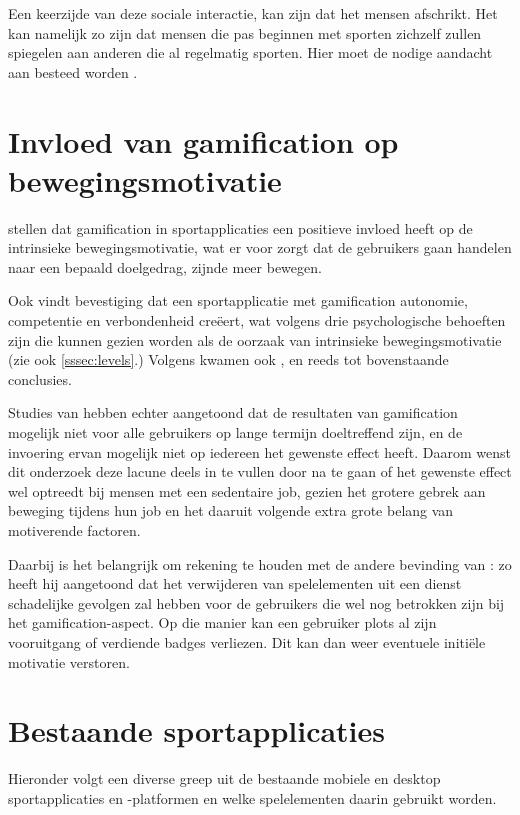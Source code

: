 Een keerzijde van deze sociale interactie, kan zijn dat het mensen afschrikt. Het kan namelijk zo zijn dat mensen die pas beginnen met sporten zichzelf zullen spiegelen aan anderen die al regelmatig sporten. Hier moet de nodige aandacht aan besteed worden \autocite{Jong2010}.

\section{Invloed van gamification op bewegingsmotivatie}

\textcite{Kari2016} stellen dat gamification in sportapplicaties een positieve invloed heeft op de intrinsieke bewegingsmotivatie, wat er voor zorgt dat de gebruikers gaan handelen naar een bepaald doelgedrag, zijnde meer bewegen.

Ook \textcite{Bitrian2020} vindt bevestiging dat een sportapplicatie met gamification autonomie, competentie en verbondenheid creëert, wat volgens \textcite{ManzanoLeon2021} drie psychologische behoeften zijn die kunnen gezien worden als de oorzaak van intrinsieke bewegingsmotivatie (zie ook \ref{sssec:levels}.) Volgens \textcite{Tu2019} kwamen ook \textcite{Lewis2016}, \textcite{Liu2017} en \textcite{Tabak2015} reeds tot bovenstaande conclusies.

Studies van \textcite{Hamari2013a} hebben echter aangetoond dat de resultaten van gamification mogelijk niet voor alle gebruikers op lange termijn doeltreffend zijn, en de invoering ervan mogelijk niet op iedereen het gewenste effect heeft. Daarom wenst dit onderzoek deze lacune deels in te vullen door na te gaan of het gewenste effect wel optreedt bij mensen met een sedentaire job, gezien het grotere gebrek aan beweging tijdens hun job en het daaruit volgende extra grote belang van motiverende factoren.

Daarbij is het belangrijk om rekening te houden met de andere bevinding van \textcite{Hamari2013a}: zo heeft hij aangetoond dat het verwijderen van spelelementen uit een dienst schadelijke gevolgen zal hebben voor de gebruikers die wel nog betrokken zijn bij het gamification-aspect. Op die manier kan een gebruiker plots al zijn vooruitgang of verdiende badges verliezen. Dit kan dan weer eventuele initiële motivatie verstoren.

\section{Bestaande sportapplicaties}
Hieronder volgt een diverse greep uit de bestaande mobiele en desktop sportapplicaties en -platformen en welke spelelementen daarin gebruikt worden.

